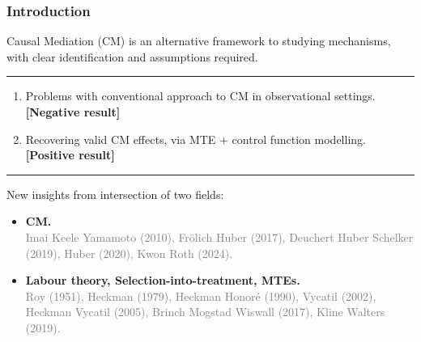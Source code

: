 \documentclass[dvipsnames]{beamer} %
\begin{document}
\begin{frame}
    \frametitle{Introduction}
    Causal Mediation (CM) is an alternative framework to studying mechanisms, with clear identification and assumptions required.

    \par\noindent\rule{\textwidth}{0.4pt}
    \begin{enumerate}
        \item Problems with conventional approach to CM in observational settings.
        \\ \textbf{[Negative result]}
        \item Recovering valid CM effects, via MTE $+$ control function modelling.
        \\ \textbf{[Positive result]}
    \end{enumerate}

    \par\noindent\rule{\textwidth}{0.4pt}
    New insights from intersection of two fields:
    \begin{itemize}
        \item \textbf{CM.}
        \\ \textcolor{gray}{\footnotesize Imai Keele Yamamoto (2010), Fr\"olich Huber (2017), Deuchert Huber Schelker (2019), Huber (2020), Kwon Roth (2024).}
        \item \textbf{Labour theory, Selection-into-treatment, MTEs.}
        \\ \textcolor{gray}{\footnotesize Roy (1951), Heckman (1979), Heckman Honor\'e (1990), Vycatil (2002), Heckman Vycatil (2005), Brinch Mogstad Wiswall (2017), Kline Walters (2019).}
    \end{itemize}
\end{frame}
\end{document}
